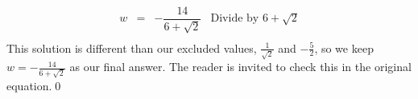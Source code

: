 \documentclass[10pt]{article}
\begin{document}
\begin{ex}
\begin{enumerate}
\[\begin{array}{rclr}
w & = & -\dfrac{14}{6 + \sqrt{2}} & \text{Divide by $6 + \sqrt{2}$} \\ 

\end{array}\] This solution is different than our excluded values, $\frac{1}{\sqrt{2}}$ and $-\frac{5}{2}$, so we keep $w = -\frac{14}{6 + \sqrt{2}}$ as our final answer.  The reader is invited to check this in the original equation.\qed













\end{enumerate}
\end{ex}
\end{document}
